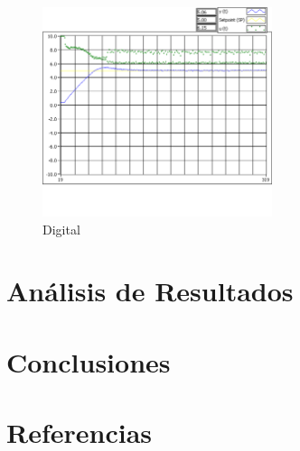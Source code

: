 \documentclass[]{article}
\begin{document}
\begin{figure}[h!]
	\centering
	\includegraphics[width=0.6\textwidth]{Imagenes/DigitalE.png}
	\caption{Digital}
	\label{fig:DigitalE}
\end{figure}

















\section{Análisis de Resultados}



\section{Conclusiones}


\section{Referencias}



\end{document}
